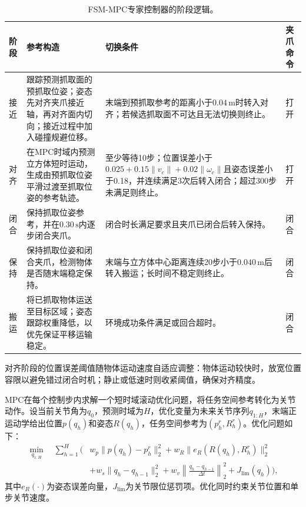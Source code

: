 \begin{table}[!htbp]
    \caption{FSM-MPC专家控制器的阶段逻辑。}
    \label{tab:expert-fsm-logic}
    \centering
    \small
    \renewcommand{\arraystretch}{1.15}
    \newcommand{\PhaseCell}[2]{\begingroup\renewcommand{\arraystretch}{0.82}\begin{tabular}[t]{@{}l@{}}#1\\[-0.45ex]{\footnotesize\textup{(#2)}}\end{tabular}\endgroup}
    \begin{tabularx}{\textwidth}{>{\raggedright\arraybackslash}p{}YY>{\centering\arraybackslash}p{0.12\textwidth}}
        \hline
        阶段 & 参考构造 & 切换条件 & 夹爪命令 \\
        \hline
        接近 & 跟踪预测抓取面的预抓取位姿；姿态先对齐夹爪接近轴，再对齐面内切向；接近过程中加入碰撞规避位移。 & 末端到预抓取参考的距离小于$0.04\,\mathrm{m}$时转入对齐；若候选抓取面不可达且无法切换则终止。 & 打开 \\
        对齐 & 在MPC时域内预测立方体短时运动，生成由预抓取位姿平滑过渡至抓取位姿的参考轨迹。 & 至少等待10步；位置误差小于$0.025+0.15\|v_c\|+0.02\|\omega_c\|$且姿态误差小于0.18，并连续满足3次后转入闭合；超过300步未满足则终止。 & 打开 \\
        闭合 & 保持抓取位姿参考，并在$0.30\,\mathrm{s}$内逐步闭合夹爪。 & 闭合时长满足要求且夹爪已闭合后转入保持。 & 闭合 \\
        保持 & 保持抓取位姿和闭合夹爪，检测物体是否随末端稳定保持。 & 末端与立方体中心距离连续20步小于$0.040\,\mathrm{m}$后转入搬运；长时间不稳定则终止。 & 闭合 \\
        搬运 & 将已抓取物体运送至目标区域；姿态跟踪权重降低，以优先保证平移运输稳定。 & 环境成功条件满足或回合超时。 & 闭合 \\
        \hline
    \end{tabularx}
\end{table}

对齐阶段的位置误差阈值随物体运动速度自适应调整：物体运动较快时，放宽位置容限以避免错过闭合时机；静止或低速时则收紧阈值，确保对齐精度。

MPC在每个控制步内求解一个短时域滚动优化问题，将任务空间参考转化为关节动作。设当前关节角为$q_0$，预测时域为$H$，优化变量为未来关节序列$q_{1:H}$，末端正运动学给出位置$p(q_h)$和姿态$R(q_h)$，任务空间参考为$(p^r_h,R^r_h)$。优化问题如下：
\begin{equation}
    \begin{aligned}
    \min_{q_{1:H}} \quad
    \sum_{h=1}^{H}\Big(
    & w_p\|p(q_h)-p^r_h\|_2^2
    + w_R\|e_R(R(q_h),R^r_h)\|_2^2 \\
    & + w_s\|q_h-q_{h-1}\|_2^2
    + w_v\left\|\frac{q_h-q_{h-1}}{\Delta t}\right\|_2^2
    + J_{\mathrm{lim}}(q_h)
    \Big),
    \end{aligned}
    \label{eq:expert-mpc-objective}
\end{equation}
其中$e_R(\cdot)$为姿态误差向量，$J_{\mathrm{lim}}$为关节限位惩罚项。优化同时约束关节位置和单步关节速度。


